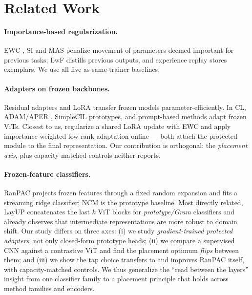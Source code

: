 \documentclass{article} %
\begin{document}
\section{Related Work}
\label{sec:related}
\paragraph{Importance-based regularization.} EWC \citep{kirkpatrick2017ewc},
SI \citep{zenke2017si} and MAS \citep{aljundi2018mas} penalize movement of
parameters deemed important for previous tasks; LwF \citep{li2016lwf} distills
previous outputs, and experience replay \citep{chaudhry2019er} stores
exemplars. We use all five as same-trainer baselines.

\paragraph{Adapters on frozen backbones.} Residual adapters
\citep{rebuffi2017adapters,houlsby2019adapters} and LoRA \citep{hu2021lora}
transfer frozen models parameter-efficiently. In CL, ADAM/APER
\citep{zhou2023revisiting}, SimpleCIL prototypes, and prompt-based methods
\citep{wang2022l2p,wang2022dualprompt,smith2023coda} adapt frozen ViTs.
Closest to us, \citet{ewclora2026} regularize a shared LoRA update with EWC and
\citet{onlinelora2025} apply importance-weighted low-rank adaptation online ---
both attach the protected module to the final representation. Our contribution
is orthogonal: the \emph{placement axis}, plus capacity-matched controls
neither reports.

\paragraph{Frozen-feature classifiers.} RanPAC \citep{mcdonnell2023ranpac}
projects frozen features through a fixed random expansion and fits a streaming
ridge classifier; NCM \citep{rebuffi2017icarl,zhou2023revisiting} is the
prototype baseline. Most directly related, LayUP \citep{layup2024} concatenates
the last $k$ ViT blocks for \emph{prototype/Gram} classifiers and already
observes that intermediate representations are more robust to domain shift.
Our study differs on three axes: (i) we study \emph{gradient-trained protected
adapters}, not only closed-form prototype heads; (ii) we compare a supervised
CNN against a contrastive ViT and find the placement optimum \emph{flips}
between them; and (iii) we show the tap choice transfers to and improves RanPAC
itself, with capacity-matched controls. We thus generalize the ``read between
the layers'' insight from one classifier family to a placement principle that
holds across method families and encoders.
\end{document}
